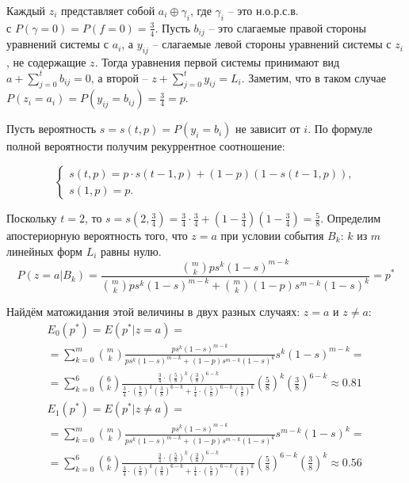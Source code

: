 Каждый $z_i$ представляет собой $a_i \oplus \gamma_i$, где $\gamma_i$ -- это н.о.р.с.в. \\ с $P(\gamma = 0) = P(f = 0) = \frac{3}{4}$. Пусть $b_{ij}$ -- это слагаемые правой стороны уравнений системы с $a_i$, а $y_{ij}$ -- слагаемые левой стороны уравнений системы с $z_i$, не содержащие $z$. Тогда уравнения первой системы принимают вид $a + \sum_{j=0}^{t}b_{ij} = 0$, а второй -- $z + \sum_{j=0}^{t}y_{ij} = L_i$. Заметим, что в таком случае $P(z_i = a_i) = P(y_{ij} = b_{ij}) = \frac{3}{4} = p$.

Пусть вероятность $s = s(t, p) = P(y_i = b_i)$ не зависит от $i$. По формуле полной вероятности получим рекуррентное соотношение:

\begin{equation*}
\begin{cases}
s(t,p) = p \cdot s(t-1, p) + (1-p)(1-s(t-1, p)), \\
s(1,p) = p.
\end{cases}
\end{equation*}

Поскольку $t=2$, то $s = s(2, \frac{3}{4}) = \frac{3}{4} \cdot \frac{3}{4} + (1-\frac{3}{4})(1-\frac{3}{4}) = \frac{5}{8}$. Определим апостериорную вероятность того, что $z=a$ при условии события $B_k$: $k$ из $m$ линейных форм $L_i$ равны нулю.
$$P(z=a|B_k) = \frac{\binom{m}{k} p s^k (1-s)^{m-k}}{\binom{m}{k} p s^k (1-s)^{m-k} + \binom{m}{k} (1-p) s^{m - k} (1-s)^k} = p^*$$

Найдём матожидания этой величины в двух разных случаях: $z=a$ и $z \ne a$:
\begin{multline*}
E_0 (p^*) = E(p^*|z=a) = \\ = \sum_{k=0}^{m} \binom{m}{k} \frac{p s^k (1-s)^{m-k}}{p s^k (1-s)^{m-k} + (1-p) s^{m - k} (1-s)^k} s^k (1-s)^{m-k} = \\
= \sum_{k=0}^{6} \binom{6}{k} \frac{\frac{3}{4} \cdot (\frac{5}{8})^k (\frac{3}{8})^{6-k}}{\frac{3}{4} \cdot (\frac{5}{8})^k (\frac{3}{8})^{6-k} + \frac{1}{4} \cdot (\frac{5}{8})^{6 - k} (\frac{3}{8})^k} \left( \frac{5}{8} \right)^k \left( \frac{3}{8} \right)^{6-k} \approx 0.81
\end{multline*}
\begin{multline*}
E_1 (p^*) = E(p^*|z \ne a) = \\ = \sum_{k=0}^{m} \binom{m}{k} \frac{p s^k (1-s)^{m-k}}{p s^k (1-s)^{m-k} + (1-p) s^{m - k} (1-s)^k} s^{m-k} (1-s)^k = \\
= \sum_{k=0}^{6} \binom{6}{k} \frac{\frac{3}{4} \cdot (\frac{5}{8})^k (\frac{3}{8})^{6-k}}{\frac{3}{4} \cdot (\frac{5}{8})^k (\frac{3}{8})^{6-k} + \frac{1}{4} \cdot (\frac{5}{8})^{6 - k} (\frac{3}{8})^k} \left( \frac{5}{8} \right)^{6-k} \left( \frac{3}{8} \right)^{k} \approx 0.56
\end{multline*}

